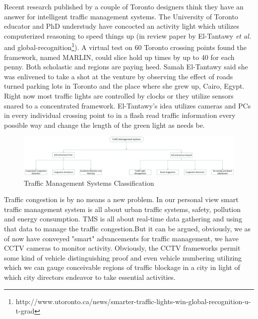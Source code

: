 \documentclass[conference]{IEEEtran}
\begin{document}
Recent research published by a couple of Toronto designers think they have an answer for intelligent traffic management systems. The University of Toronto educator and PhD understudy have concocted an activity light which utilizes computerized reasoning to speed things up (in review paper by El-Tantawy \textit{et al.}\cite{el-trantaway:multiagent} and global-recognition\footnote{http://www.utoronto.ca/news/smarter-traffic-lights-win-global-recognition-u-t-grad}). A virtual test on 60 Toronto crossing points found the framework, named MARLIN, could slice hold up times by up to 40 for each penny. Both scholastic and regions are paying heed. Samah El-Tantawy said she was enlivened to take a shot at the venture by observing the effect of roads turned parking lots in Toronto and the place where she grew up, Cairo, Egypt. Right now most traffic lights are controlled by clocks or they utilize sensors snared to a concentrated framework. El-Tantawy's idea utilizes cameras and PCs in every individual crossing point to in a flash read traffic information every possible way and change the length of the green light as needs be.
\begin{figure}[!t]
\centering
\includegraphics[width=7in]{flowDiagramTrafficManagement}
\caption{Traffic Management Systems Classification}
\label{flow_diagm}
\end{figure}


 
 Traffic congestion is by no means a new problem. In our personal view smart traffic management system is all about urban traffic systems, safety, pollution and energy consumption. TMS is all about real-time data gathering and using that data to manage the traffic congestion.But it can be argued, obviously, we as of now have conveyed "smart" advancements for traffic management, we have CCTV cameras to monitor activity. Obviously, the CCTV frameworks permit some kind of vehicle distinguishing proof and even vehicle numbering utilizing which we can gauge conceivable regions of traffic blockage in a city in light of which city directors endeavor to take essential activities. 
 
\end{document}
